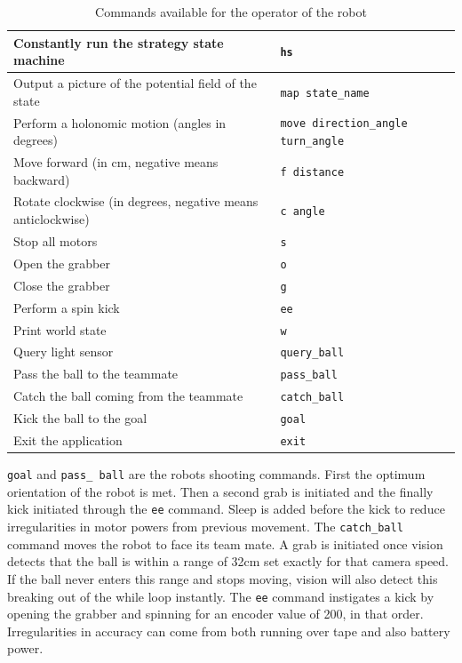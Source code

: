 \documentclass[a4paper,12pt]{article}
\begin{document}
\begin{table}[h!]
\centering
\begin{tabular}{ | p{9cm} | p{6.2cm} | }
    \hline
    Constantly run the strategy state machine &
    \small{\texttt{hs}} \\ \hline
    Output a picture of the potential field of the state &
    \small{\texttt{map state\_name}} \\ \hline
    Perform a holonomic motion (angles in degrees) &
    \small{\texttt{move direction\_angle turn\_angle}} \\ \hline
    Move forward (in cm, negative means backward) &
    \small{\texttt{f distance}} \\ \hline
    Rotate clockwise (in degrees, negative means anticlockwise) &
    \small{\texttt{c angle}} \\ \hline
    Stop all motors &
    \small{\texttt{s}} \\ \hline
    Open the grabber &
    \small{\texttt{o}} \\ \hline
    Close the grabber &
    \small{\texttt{g}} \\ \hline
    Perform a spin kick &
    \small{\texttt{ee}} \\ \hline
    Print world state &
    \small{\texttt{w}} \\ \hline
    Query light sensor &
    \small{\texttt{query\_ball}} \\ \hline
    Pass the ball to the teammate &
    \small{\texttt{pass\_ball}} \\ \hline
    Catch the ball coming from the teammate &
    \small{\texttt{catch\_ball}} \\ \hline
    Kick the ball to the goal &
    \small{\texttt{goal}} \\ \hline
    Exit the application &
    \small{\texttt{exit}} \\ \hline
\end{tabular}
\caption{Commands available for the operator of the robot}
\label{tab:commands}
\end{table}

\texttt{goal} and \texttt{pass\_ ball} are the robots shooting commands. First the optimum orientation of the robot is met. Then a second grab is initiated and the finally kick initiated through the \texttt{ee} command. Sleep is added before the kick to reduce irregularities in motor powers from previous movement. The \texttt{catch\_ball} command moves the robot to face its team mate. A grab is initiated once vision detects that the ball is within a range of 32cm set exactly for that camera speed. If the ball never enters this range and stops moving, vision will also detect this breaking out of the while loop instantly. The \texttt{ee} command instigates a kick by opening the grabber and spinning for an encoder value of 200, in that order. Irregularities in accuracy can come from both running over tape and also battery power.
\end{document}
